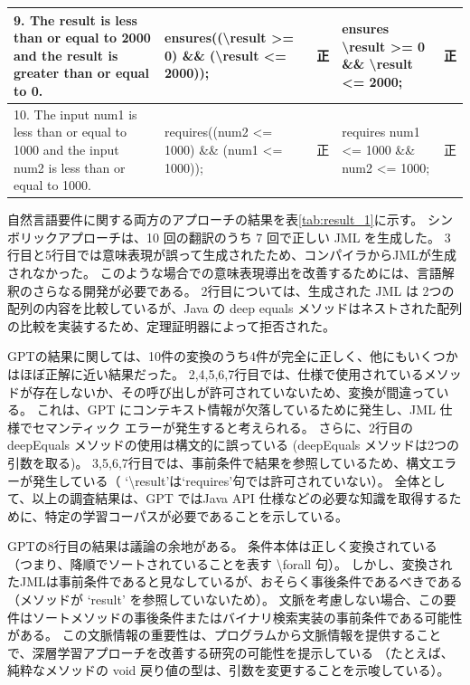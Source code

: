 \documentclass[uplatex, twocolumn,10pt]{jsarticle} %
\begin{document}
\begin{table}[t]
\begin{tabular}{p{25mm}|p{45mm}|p{7mm}|p{45mm}|p{7mm}}
        9. The result is less than or equal to 2000 and the result is greater than or equal to 0.          & ensures((\textbackslash result \textgreater= 0) \&\& (\textbackslash result \textless= 2000));                                                                                                                  & 正                                                                    & ensures \textbackslash result \textgreater= 0 \&\& \textbackslash result \textless= 2000;                                              & 正    \\ \hline
        10. The input num1 is less than or equal to 1000 and the input num2 is less than or equal to 1000. & requires((num2 \textless= 1000) \&\& (num1 \textless= 1000));                                                                                                                                                   & 正                                                                    & requires num1 \textless= 1000 \&\& num2 \textless= 1000;                                                                               & 正    \\ \hline
    \end{tabular}
\end{table}

自然言語要件に関する両方のアプローチの結果を表\ref{tab:result_1}に示す。
シンボリックアプローチは、10 回の翻訳のうち 7 回で正しい JML を生成した。
3行目と5行目では意味表現が誤って生成されたため、コンパイラからJMLが生成されなかった。
このような場合での意味表現導出を改善するためには、言語解釈のさらなる開発が必要である。
2行目については、生成された JML は 2つの配列の内容を比較しているが、Java の deep equals メソッドはネストされた配列の比較を実装するため、定理証明器によって拒否された。

GPTの結果に関しては、10件の変換のうち4件が完全に正しく、他にもいくつかはほぼ正解に近い結果だった。
2,4,5,6,7行目では、仕様で使用されているメソッドが存在しないか、その呼び出しが許可されていないため、変換が間違っている。
これは、GPT にコンテキスト情報が欠落しているために発生し、JML 仕様でセマンティック エラーが発生すると考えられる。
さらに、2行目の deepEquals メソッドの使用は構文的に誤っている (deepEquals メソッドは2つの引数を取る)。
3,5,6,7行目では、事前条件で結果を参照しているため、構文エラーが発生している（ `\textbackslash result'は`requires'句では許可されていない）。
全体として、以上の調査結果は、GPT ではJava API 仕様などの必要な知識を取得するために、特定の学習コーパスが必要であることを示している。

GPTの8行目の結果は議論の余地がある。
条件本体は正しく変換されている （つまり、降順でソートされていることを表す \textbackslash forall 句）。
しかし、変換されたJMLは事前条件であると見なしているが、おそらく事後条件であるべきである（メソッドが `result' を参照していないため）。
文脈を考慮しない場合、この要件はソートメソッドの事後条件またはバイナリ検索実装の事前条件である可能性がある。
この文脈情報の重要性は、プログラムから文脈情報を提供することで、深層学習アプローチを改善する研究の可能性を提示している
（たとえば、純粋なメソッドの void 戻り値の型は、引数を変更することを示唆している）。
\end{document}
